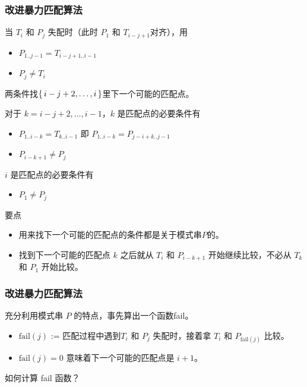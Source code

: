 \documentclass{ctexbeamer}
\begin{document}
\begin{frame}[fragile]
\frametitle{改进暴力匹配算法}


当 $T_i$ 和 $P_j$ 失配时（此时 $P_1$ 和 $T_{i - j + 1}$对齐），用
\begin{itemize}
\item $P_{1..j-1} = T_{i - j + 1..i-1}$
\item $P_j \ne T_i$
\end{itemize}
两条件找$\set{i - j + 2, \dots, i}$里下一个可能的匹配点。

\begin{block}{}
对于 $k = i - j + 2, \dots, i - 1$，$k$ 是匹配点的必要条件有
\begin{itemize}
\item $P_{1..i-k} = T_{k..i-1} $ 即 $P_{1..i-k} = P_{j - i+k ..j - 1}$
\item $P_{i - k + 1} \ne P_j$
\end{itemize}

$i$ 是匹配点的必要条件有
\begin{itemize}
\item $P_1 \ne P_j$
\end{itemize}

\end{block}


\begin{block}{要点}
\begin{itemize}
\item 用来找下一个可能的匹配点的条件都是关于模式串$P$的。
\item 找到下一个可能的匹配点 $k$ 之后就从 $T_i$ 和 $P_{i - k + 1}$ 开始继续比较，不必从 $T_k$ 和 $P_1$ 开始比较。
\end{itemize}
\end{block}

\end{frame}

\begin{frame}
\frametitle{改进暴力匹配算法}
充分利用模式串 $P$ 的特点，事先算出一个函数fail。

\begin{itemize}
\item $\text{fail}(j)$ := 匹配过程中遇到$T_i$ 和 $P_j$ 失配时，接着拿 $T_i$ 和 $P_{\text{fail}(j)}$ 比较。
\item $\text{fail}(j) = 0$ 意味着下一个可能的匹配点是 $i+1$。
\end{itemize}

\begin{block}{}
如何计算 fail 函数？
\end{block}

\end{frame}
\end{document}
